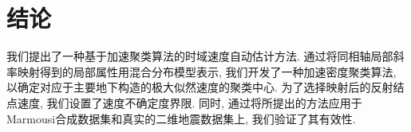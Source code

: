 \section{结论}
我们提出了一种基于加速聚类算法的时域速度自动估计方法. 通过将同相轴局部斜率映射得到的局部属性用混合分布模型表示, 我们开发了一种加速密度聚类算法, 以确定对应于主要地下构造的极大似然速度的聚类中心. 为了选择映射后的反射结点速度, 我们设置了速度不确定度界限. 同时, 通过将所提出的方法应用于Marmousi合成数据集和真实的二维地震数据集上, 我们验证了其有效性. 
